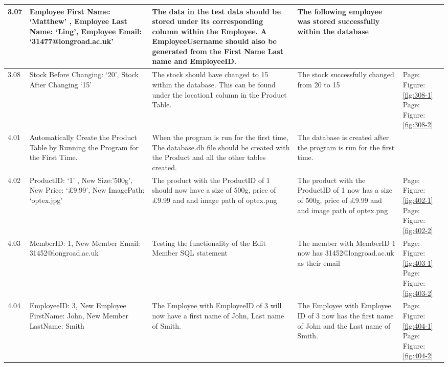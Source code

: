 \begin{flushleft}
\begin{longtable}{|p{1.0cm}|p{2.5cm}|p{3cm}|p{3.0cm}|p{2.5cm}|}
	3.07 & Employee First Name: `Matthew' , Employee Last Name: `Ling', Employee Email: `31477@longroad.ac.uk' & The data in the test data should be stored under its corresponding column within the Employee. A EmployeeUsername should also be generated from the First Name Last name and EmployeeID. & The following employee was stored successfully within the database& \\ \hline
	3.08 &  Stock Before Changing: `20', Stock After Changing `15'  & The stock should have changed to 15 within the database. This can be found under the location1 column in the Product Table.& The stock successfully changed from 20 to 15& Page:\pageref{fig:308-1}  \newline Figure:\ref{fig:308-1} \newline \newline  Page:\pageref{fig:308-2}  \newline Figure:\ref{fig:308-2} \\ \hline
	4.01 & Automatically Create the Product Table by Running the Program for the First Time. & When the program is run for the first time, The database.db file should be created with the Product and all the other tables created. & The database is created after the program is run for the first time. &  \\ \hline
	4.02 & ProductID: `1' ,  New Size:'500g', New Price: `£9.99',  New ImagePath: `optex.jpg' & The product with the ProductID of 1 should now have a size of 500g, price of £9.99 and and image path of optex.png& The product with the ProductID of 1 now has a size of 500g, price of £9.99 and and image path of optex.png& Page:\pageref{fig:402-1}  \newline Figure:\ref{fig:402-1} \newline \newline  Page:\pageref{fig:402-2}  \newline Figure:\ref{fig:402-2}   \\ \hline
	4.03 & MemberID: 1, New Member Email: 31452@longroad.ac.uk & Testing the functionality of the Edit Member SQL statement & The member with MemberID 1 now has 31452@longroad.ac.uk as their email &  Page:\pageref{fig:403-1}  \newline Figure:\ref{fig:403-1} \newline \newline  Page:\pageref{fig:403-2}  \newline Figure:\ref{fig:403-2}\\ \hline
	4.04 & EmployeeID: 3, New Employee FirstName: John, New Member LastName: Smith  & The Employee with EmployeeID of 3 will now have a first name of John, Last name of Smith.& The Employee with Employee ID of 3 now has the first name of John and the Last name of Smith. &  Page:\pageref{fig:404-1}  \newline Figure:\ref{fig:404-1} \newline \newline  Page:\pageref{fig:404-2}  \newline Figure:\ref{fig:404-2}\\ \hline 

\end{longtable}
\end{flushleft}
